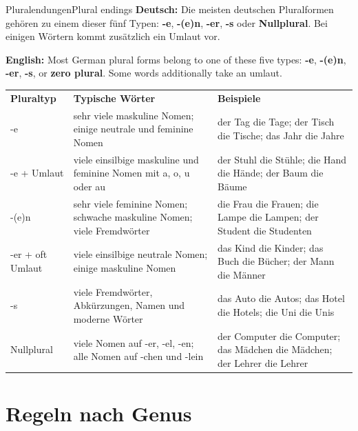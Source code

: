 \documentclass[a4paper,11pt]{article}
\newcommand{\GermanText}[1]{\textbf{Deutsch: }#1\par}
\newcommand{\EnglishText}[1]{{\small\color{SoftGray}\textbf{English: }#1\par}}
\newcommand{\TableHead}[3]{\rowcolor{HeaderBlueDark}\color{white}\textbf{#1} & \color{white}\textbf{#2} & \color{white}\textbf{#3}\\}
\begin{document}
\begin{grammarentry}{Pluralendungen}{Plural endings}
\GermanText{Die meisten deutschen Pluralformen gehören zu einem dieser fünf Typen: \textbf{-e}, \textbf{-(e)n}, \textbf{-er}, \textbf{-s} oder \textbf{Nullplural}. Bei einigen Wörtern kommt zusätzlich ein Umlaut vor.}
\EnglishText{Most German plural forms belong to one of these five types: \textbf{-e}, \textbf{-(e)n}, \textbf{-er}, \textbf{-s}, or \textbf{zero plural}. Some words additionally take an umlaut.}

\renewcommand{\arraystretch}{1.35}
\begin{longtable}{>{\RaggedRight\arraybackslash}p{}>{\RaggedRight\arraybackslash}p{}>{\RaggedRight\arraybackslash}p{}}
\TableHead{Pluraltyp}{Typische Wörter}{Beispiele}
\rowcolor{RowBlueLight} -e & sehr viele maskuline Nomen; einige neutrale und feminine Nomen & der Tag \textrightarrow{} die Tage; der Tisch \textrightarrow{} die Tische; das Jahr \textrightarrow{} die Jahre \\
\rowcolor{RowBlueDark} -e + Umlaut & viele einsilbige maskuline und feminine Nomen mit a, o, u oder au & der Stuhl \textrightarrow{} die Stühle; die Hand \textrightarrow{} die Hände; der Baum \textrightarrow{} die Bäume \\
\rowcolor{RowBlueLight} -(e)n & sehr viele feminine Nomen; schwache maskuline Nomen; viele Fremdwörter & die Frau \textrightarrow{} die Frauen; die Lampe \textrightarrow{} die Lampen; der Student \textrightarrow{} die Studenten \\
\rowcolor{RowBlueDark} -er + oft Umlaut & viele einsilbige neutrale Nomen; einige maskuline Nomen & das Kind \textrightarrow{} die Kinder; das Buch \textrightarrow{} die Bücher; der Mann \textrightarrow{} die Männer \\
\rowcolor{RowBlueLight} -s & viele Fremdwörter, Abkürzungen, Namen und moderne Wörter & das Auto \textrightarrow{} die Autos; das Hotel \textrightarrow{} die Hotels; die Uni \textrightarrow{} die Unis \\
\rowcolor{RowBlueDark} Nullplural & viele Nomen auf -er, -el, -en; alle Nomen auf -chen und -lein & der Computer \textrightarrow{} die Computer; das Mädchen \textrightarrow{} die Mädchen; der Lehrer \textrightarrow{} die Lehrer \\
\end{longtable}
\end{grammarentry}

\section{Regeln nach Genus}
\end{document}
